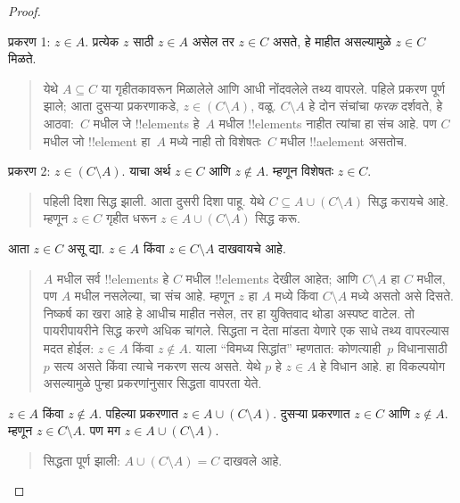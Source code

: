 \documentclass[../../../include/open-logic-section]{subfiles}
\begin{document}
\begin{proof}
\begin{quote}
\end{quote}
प्रकरण 1: $z \in A$. प्रत्येक $z$ साठी $z \in A$ असेल तर $z \in C$ असते, हे माहीत असल्यामुळे $z \in C$ मिळते.
\begin{quote}
येथे $A \subseteq C$ या गृहीतकावरून मिळालेले आणि आधी नोंदवलेले तथ्य वापरले. पहिले प्रकरण पूर्ण झाले; आता दुसऱ्या प्रकरणाकडे, $z \in (C \setminus A)$, वळू. $C \setminus A$ हे दोन संचांचा \emph{फरक} दर्शवते, हे आठवा:~$C$ मधील जे !!{element}s हे~$A$ मधील !!{element}s नाहीत त्यांचा हा संच आहे. पण $C$ मधील जो !!{element} हा~$A$ मध्ये नाही तो विशेषतः~$C$ मधील !!a{element} असतोच.
\end{quote}
प्रकरण 2: $z \in (C \setminus A)$. याचा अर्थ $z \in C$ आणि $z \notin A$. म्हणून विशेषतः $z \in C$.
\begin{quote}
पहिली दिशा सिद्ध झाली. आता दुसरी दिशा पाहू. येथे $C \subseteq A \cup (C \setminus A)$ सिद्ध करायचे आहे. म्हणून $z \in C$ गृहीत धरून $z \in A \cup (C \setminus A)$ सिद्ध करू.
\end{quote}
आता $z \in C$ असू द्या. $z \in A$ किंवा $z \in C \setminus A$ दाखवायचे आहे.
\begin{quote}
$A$ मधील सर्व !!{element}s हे $C$ मधील !!{element}s देखील आहेत; आणि $C \setminus A$ हा $C$ मधील, पण $A$ मधील नसलेल्या, चा संच आहे. म्हणून $z$ हा $A$ मध्ये किंवा $C \setminus A$ मध्ये असतो असे दिसते. निष्कर्ष का खरा आहे हे आधीच माहीत नसेल, तर हा युक्तिवाद थोडा अस्पष्ट वाटेल. तो पायरीपायरीने सिद्ध करणे अधिक चांगले. सिद्धता न देता मांडता येणारे एक साधे तथ्य वापरल्यास मदत होईल: $z \in A$ किंवा $z \notin A$. याला “विमध्य सिद्धांत” म्हणतात: कोणत्याही~$p$ विधानासाठी $p$ सत्य असते किंवा त्याचे नकरण सत्य असते. येथे $p$ हे $z \in A$ हे विधान आहे. हा विकल्पयोग असल्यामुळे पुन्हा प्रकरणांनुसार सिद्धता वापरता येते.
\end{quote}
$z \in A$ किंवा $z \notin A$. पहिल्या प्रकरणात $z \in A \cup (C \setminus A)$. दुसऱ्या प्रकरणात $z \in C$ आणि $z \notin A$. म्हणून $z \in C \setminus A$. पण मग $z \in A \cup (C \setminus A)$.
\begin{quote}
सिद्धता पूर्ण झाली: $A \cup (C \setminus A) = C$ दाखवले आहे.
\end{quote}
\end{proof}
\end{document}
